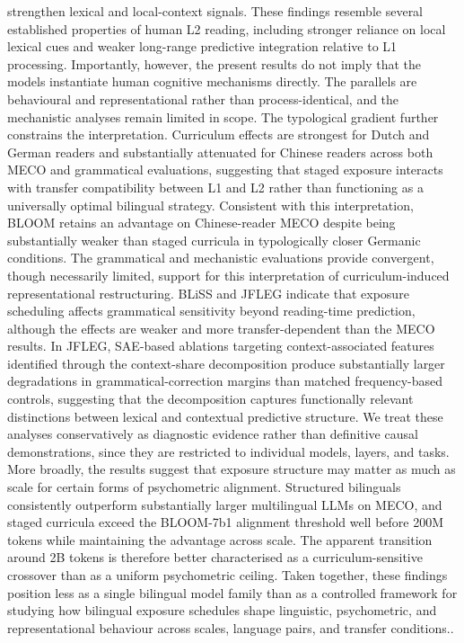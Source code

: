 strengthen lexical and local-context signals. These findings resemble several established properties of human L2 reading, including stronger reliance on local lexical cues and weaker long-range predictive integration relative to L1 processing. Importantly, however, the present results do not imply that the models instantiate human cognitive mechanisms directly. The parallels are behavioural and representational rather than process-identical, and the mechanistic analyses remain limited in scope. The typological gradient further constrains the interpretation. Curriculum effects are strongest for Dutch and German readers and substantially attenuated for Chinese readers across both MECO and grammatical evaluations, suggesting that staged exposure interacts with transfer compatibility between L1 and L2 rather than functioning as a universally optimal bilingual strategy. Consistent with this interpretation, BLOOM retains an advantage on Chinese-reader MECO despite being substantially weaker than staged \beetle{} curricula in typologically closer Germanic conditions. The grammatical and mechanistic evaluations provide convergent, though necessarily limited, support for this interpretation of curriculum-induced representational restructuring. BLiSS and JFLEG indicate that exposure scheduling affects grammatical sensitivity beyond reading-time prediction, although the effects are weaker and more transfer-dependent than the MECO results. In JFLEG, SAE-based ablations targeting context-associated features identified through the context-share decomposition produce substantially larger degradations in grammatical-correction margins than matched frequency-based controls, suggesting that the decomposition captures functionally relevant distinctions between lexical and contextual predictive structure. We treat these analyses conservatively as diagnostic evidence rather than definitive causal demonstrations, since they are restricted to individual models, layers, and tasks. More broadly, the results suggest that exposure structure may matter as much as scale for certain forms of psychometric alignment. Structured \beetle{} bilinguals consistently outperform substantially larger multilingual LLMs on MECO, and staged curricula exceed the BLOOM-7b1 alignment threshold well before 200M tokens while maintaining the advantage across scale. The apparent transition around 2B tokens is therefore better characterised as a curriculum-sensitive crossover than as a uniform psychometric ceiling. Taken together, these findings position \beetle{} less as a single bilingual model family than as a controlled framework for studying how bilingual exposure schedules shape linguistic, psychometric, and representational behaviour across scales, language pairs, and transfer conditions..


